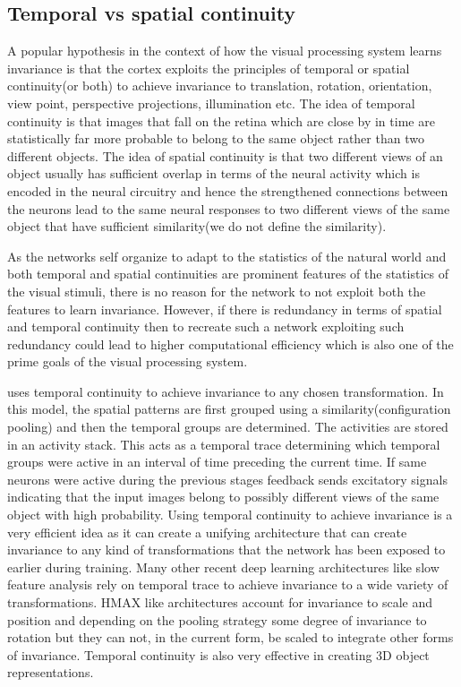 \documentclass[12pt,twoside]{article}
\theoremstyle{plain}
\theoremstyle{definition}
\theoremstyle{remark}
\begin{document}
\subsection{Temporal vs spatial continuity}
\label{Subsec:TempSpat}
A popular hypothesis in the context of how the visual processing system learns invariance is that the cortex exploits the principles of temporal or spatial continuity(or both) to achieve invariance to translation, rotation, orientation, view point, perspective projections, illumination etc. The idea of temporal continuity is that images that fall on the retina which are close by in time are statistically far more probable to belong to the same object rather than two different objects. The idea of spatial continuity is that two different views of an object usually has sufficient overlap in terms of the neural activity which is encoded in the neural circuitry and hence the strengthened connections between the neurons lead to the same neural responses to two different views of the same object that have sufficient similarity(we do not define the similarity).

As the networks self organize to adapt to the statistics of the natural world and both temporal and spatial continuities are prominent features of the statistics of the visual stimuli, there is no reason for the network to not exploit both the features to learn invariance. However, if there is redundancy in terms of spatial and temporal continuity then to recreate such a network exploiting such redundancy could lead to higher computational efficiency which is also one of the prime goals of the visual processing system. 

\cite{MarkusLessmann2014} uses temporal continuity to achieve invariance to any chosen transformation. In this model, the spatial patterns are first grouped using a similarity(configuration pooling) and then the temporal groups are determined. The activities are stored in an activity stack. This acts as a temporal trace determining which temporal groups were active in an interval of time preceding the current time. If same neurons were active during the previous stages feedback sends excitatory signals indicating that the input images belong to possibly different views of the same object with high probability. Using temporal continuity to achieve invariance is a very efficient idea as it can create a unifying architecture that can create invariance to any kind of transformations that the network has been exposed to earlier during training. Many other recent deep learning architectures like slow feature analysis rely on temporal trace to achieve invariance to a wide variety of transformations. HMAX like architectures account for invariance to scale and position and depending on the pooling strategy some degree of invariance to rotation but they can not, in the current form, be scaled to integrate other forms of invariance. Temporal continuity is also very effective in creating 3D object representations. 
\end{document}
